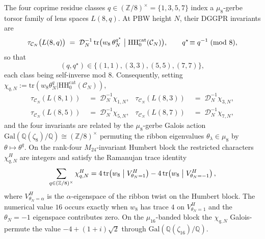 \begin{theorem}
\label{thm:modtr-lens-tower-L8q}
The four coprime residue classes $q\in (\mathbb Z/8)^\times = \{1, 3, 5, 7\}$
index a $\mu_8$-gerbe torsor family of lens spaces $L(8, q)$. At PBW
height \(N\), their DGGPR invariants are
\[
 \tau_{\mathcal C_N}\bigl(L(8, q)\bigr)
 \;=\;
 \mathcal D_N^{-1}\,
 \mathrm{tr}\bigl(w_8\,\theta_N^{q^\star}\bigm\vert
 \mathrm{HH}_0^{\mathrm{cat}}(\mathcal C_N)\bigr),
 \qquad
 q^\star\!\equiv q^{-1}\!\pmod 8,
\]
so that
\[
 (q, q^\star)\in\{(1,1), (3,3), (5,5), (7,7)\},
\]
each class being self-inverse mod $8$. Consequently, setting
\(\chi_{q,N} := \mathrm{tr}(w_8\theta_N^q|
\mathrm{HH}_0^{\mathrm{cat}}(\mathcal C_N))\),
\begin{align*}
 \tau_{\mathcal C_N}(L(8, 1)) &\;=\; \mathcal D_N^{-1}\chi_{1,N}, &
 \tau_{\mathcal C_N}(L(8, 3)) &\;=\; \mathcal D_N^{-1}\chi_{3,N},\\
 \tau_{\mathcal C_N}(L(8, 5)) &\;=\; \mathcal D_N^{-1}\chi_{5,N}, &
 \tau_{\mathcal C_N}(L(8, 7)) &\;=\; \mathcal D_N^{-1}\chi_{7,N},
\end{align*}
and the four invariants are related by the $\mu_8$-gerbe Galois action
$\mathrm{Gal}(\mathbb Q(\zeta_8)/\mathbb Q)\cong(\mathbb Z/8)^\times$
permuting the ribbon eigenvalues $\theta_\lambda\in\mu_8$ by
$\theta\mapsto\theta^q$.
On the rank-four \(M_{24}\)-invariant Humbert block the restricted
characters \(\chi^{H}_{q,N}\) are integers and satisfy the Ramanujan
trace identity
\[
 \sum_{q\in(\mathbb Z/8)^\times}\chi^H_{q,N}
 =
 4\,\mathrm{tr}\!\left(w_8\bigm|V^H_{\theta_N=1}\right)
 -
 4\,\mathrm{tr}\!\left(w_8\bigm|V^H_{\theta_N=-1}\right),
\]
where \(V^H_{\theta_N=\alpha}\) is the \(\alpha\)-eigenspace of the
ribbon twist on the Humbert block. The numerical value \(16\) occurs
exactly when \(w_8\) has trace \(4\) on \(V^H_{\theta_N=1}\) and the
\(\theta_N=-1\) eigenspace contributes zero. On the
\(\mu_{16}\)-banded block the \(\chi_{q,N}\) Galois-permute the value
$-4 + (1+i)\sqrt 2$ through $\mathrm{Gal}(\mathbb Q(\zeta_{16})/\mathbb Q)$.
\end{theorem}

